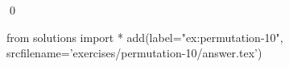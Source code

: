 
\begin{ex} 
  \label{ex:permutation-10}
  
  \qed
\end{ex} 
\begin{python0}
from solutions import *
add(label="ex:permutation-10",
    srcfilename='exercises/permutation-10/answer.tex') 
\end{python0}
